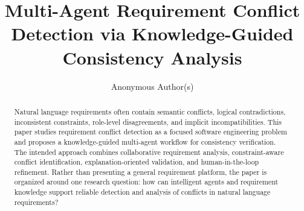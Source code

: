 \documentclass[sigconf,anonymous,review]{acmart}
\title{Multi-Agent Requirement Conflict Detection via Knowledge-Guided Consistency Analysis}
\author{Anonymous Author(s)}
\affiliation{
  \institution{Anonymous Institution}
  \country{Anonymous Country}
}
\begin{document}
\begin{abstract}
Natural language requirements often contain semantic conflicts, logical contradictions,
inconsistent constraints, role-level disagreements, and implicit incompatibilities.
This paper studies requirement conflict detection as a focused software engineering
problem and proposes a knowledge-guided multi-agent workflow for consistency
verification. The intended approach combines collaborative requirement analysis,
constraint-aware conflict identification, explanation-oriented validation, and
human-in-the-loop refinement. Rather than presenting a general requirement platform,
the paper is organized around one research question: how can intelligent agents and
requirement knowledge support reliable detection and analysis of conflicts in
natural language requirements?
\end{abstract}



\maketitle



















\appendix



\end{document}
